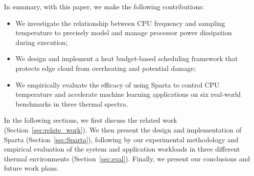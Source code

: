 In summary, with this paper, we make the following contributions:

\begin{itemize}
    \item We investigate the relationship between CPU frequency and sampling temperature to precisely model and manage processor power dissipation during execution;
    \item We design and implement a heat budget-based scheduling framework that protects edge cloud from overheating and potential damage;
    \item We empirically evaluate the efficacy of using Sparta to control CPU temperature and accelerate machine learning applications on six real-world benchmarks in three thermal spectra. 
\end{itemize}

In the following sections, we first discuss the related work (Section~\ref{sec:relate_work}). We then present the design and implementation of Sparta (Section~\ref{sec:Sparta}), following by our experimental methodology and empirical evaluation of the system and application workloads in three different thermal environments (Section~\ref{sec:eval}). Finally, we present our conclusions and future work plans.